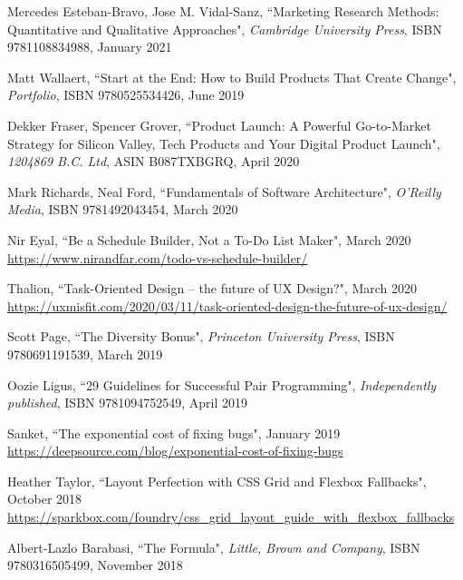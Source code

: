 \begin{thebibliography}{100}
 Mercedes Esteban-Bravo, Jose M. Vidal-Sanz, ``Marketing Research Methods: Quantitative and 
Qualitative Approaches", \emph{Cambridge University Press}, ISBN 9781108834988, January 2021

 Matt Wallaert, ``Start at the End: How to Build Products That Create Change", 
\emph{Portfolio}, ISBN 9780525534426, June 2019 

 Dekker Fraser, Spencer Grover, ``Product Launch: A Powerful Go-to-Market Strategy for Silicon 
Valley, Tech Products and Your Digital Product Launch", \emph{1204869 B.C. Ltd}, ASIN B087TXBGRQ, April 2020

 Mark Richards, Neal Ford, ``Fundamentals of Software Architecture",
\emph{O'Reilly Media}, ISBN 9781492043454, March 2020  

 Nir Eyal, ``Be a Schedule Builder, Not a To-Do List Maker", March 2020
\href{https://www.nirandfar.com/todo-vs-schedule-builder/}{https://www.nirandfar.com/todo-vs-schedule-builder/}

 Thalion, ``Task-Oriented Design -- the future of UX Design?", March 2020
\href{https://uxmisfit.com/2020/03/11/task-oriented-design-the-future-of-ux-design/}{https://uxmisfit.com/2020/03/11/task-oriented-design-the-future-of-ux-design/}

 Scott Page, ``The Diversity Bonus", \emph{Princeton University Press}, ISBN 9780691191539, 
March 2019

 Oozie Ligus, ``29 Guidelines for Successful Pair Programming", \emph{Independently published},
ISBN 9781094752549, April 2019

 Sanket, ``The exponential cost of fixing bugs", January 2019\\
\href{https://deepsource.com/blog/exponential-cost-of-fixing-bugs}{https://deepsource.com/blog/exponential-cost-of-fixing-bugs}

 Heather Taylor, ``Layout Perfection with CSS Grid and Flexbox Fallbacks", October 2018
\href{https://sparkbox.com/foundry/css_grid_layout_guide_with_flexbox_fallbacks}{https://sparkbox.com/foundry/css\_grid\_layout\_guide\_with\_flexbox\_fallbacks}

 Albert-Lazlo Barabasi, ``The Formula", \emph{Little, Brown and Company}, ISBN 9780316505499, 
November 2018 


\end{thebibliography}
